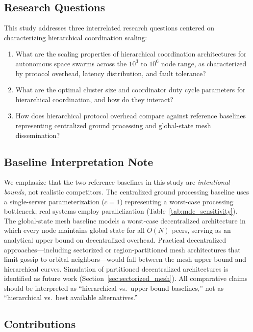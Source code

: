 \documentclass[journal]{IEEEtran}
\begin{document}
\subsection{Research Questions}

This study addresses three interrelated research questions centered on characterizing hierarchical coordination scaling:

\begin{enumerate}
    \item[\textbf{RQ1:}] What are the scaling properties of hierarchical coordination architectures for autonomous space swarms across the $10^3$ to $10^6$ node range, as characterized by protocol overhead, latency distribution, and fault tolerance?
    \item[\textbf{RQ2:}] What are the optimal cluster size and coordinator duty cycle parameters for hierarchical coordination, and how do they interact?
    \item[\textbf{RQ3:}] How does hierarchical protocol overhead compare against reference baselines representing centralized ground processing and global-state mesh dissemination?
\end{enumerate}

\subsection{Baseline Interpretation Note}

We emphasize that the two reference baselines in this study are \emph{intentional bounds}, not realistic competitors. The centralized ground processing baseline uses a single-server parameterization ($c = 1$) representing a worst-case processing bottleneck; real systems employ parallelization (Table~\ref{tab:mdc_sensitivity}). The global-state mesh baseline models a worst-case decentralized architecture in which every node maintains global state for all $O(N)$ peers, serving as an analytical upper bound on decentralized overhead. Practical decentralized approaches---including sectorized or region-partitioned mesh architectures that limit gossip to orbital neighbors---would fall between the mesh upper bound and hierarchical curves. Simulation of partitioned decentralized architectures is identified as future work (Section~\ref{sec:sectorized_mesh}). All comparative claims should be interpreted as ``hierarchical vs.\ upper-bound baselines,'' not as ``hierarchical vs.\ best available alternatives.''

\subsection{Contributions}
\end{document}
